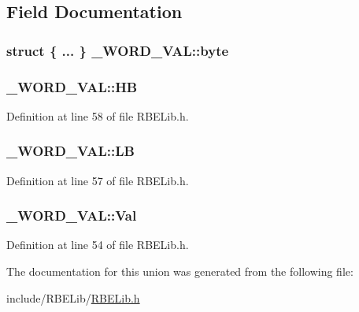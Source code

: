\subsection{Field Documentation}
\hypertarget{union___w_o_r_d___v_a_l_ad7a0075252b41d01f900c602d940e0aa}{
\subsubsection[{byte}]{\setlength{\rightskip}{0pt plus 5cm}struct \{ ... \}   \+\_\+\+W\+O\+R\+D\+\_\+\+V\+A\+L\+::byte}}\label{union___w_o_r_d___v_a_l_ad7a0075252b41d01f900c602d940e0aa}
\hypertarget{union___w_o_r_d___v_a_l_a912b51805454255a794b26e6646c0cf1}{
\subsubsection[{H\+B}]{ \+\_\+\+W\+O\+R\+D\+\_\+\+V\+A\+L\+::\+H\+B}}\label{union___w_o_r_d___v_a_l_a912b51805454255a794b26e6646c0cf1}


Definition at line 58 of file R\+B\+E\+Lib.\+h.

\hypertarget{union___w_o_r_d___v_a_l_aa012d9c31fb3018cbe4d6a5052d98f51}{
\subsubsection[{L\+B}]{ \+\_\+\+W\+O\+R\+D\+\_\+\+V\+A\+L\+::\+L\+B}}\label{union___w_o_r_d___v_a_l_aa012d9c31fb3018cbe4d6a5052d98f51}


Definition at line 57 of file R\+B\+E\+Lib.\+h.

\hypertarget{union___w_o_r_d___v_a_l_a3b0f626d2e15ff5aa21804dd598d23c9}{
\subsubsection[{Val}]{ \+\_\+\+W\+O\+R\+D\+\_\+\+V\+A\+L\+::\+Val}}\label{union___w_o_r_d___v_a_l_a3b0f626d2e15ff5aa21804dd598d23c9}


Definition at line 54 of file R\+B\+E\+Lib.\+h.



The documentation for this union was generated from the following file\+:\begin{DoxyCompactItemize}
\item 
include/\+R\+B\+E\+Lib/\hyperlink{_r_b_e_lib_8h}{R\+B\+E\+Lib.\+h}\end{DoxyCompactItemize}
